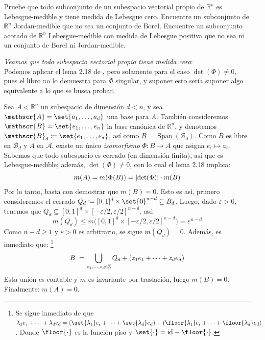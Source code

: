\setcounter{neje}{25}
\begin{nejer}
Pruebe que todo subconjunto de un subespacio vectorial propio de $\mathbb{R}^n$ es Lebesgue-medible y tiene medida de Lebesgue cero. Encuentre un subconjunto de $\mathbb{R}^n$ Jordan-medible que no sea un conjunto de Borel. Encuentre un subconjunto acotado de $\mathbb{R}^n$ Lebesgue-medible con medida de Lebesgue positiva que no sea ni un conjunto de Borel ni Jordan-medible.
\end{nejer}
\begin{sol}
\emph{Veamos que todo subespacio vectorial propio tiene medida cero}:\\
Podemos aplicar el lema 2.18 de \cite{Salamon}, pero solamente para el caso $\det(\Phi) \neq 0 $, pues el libro no lo demuestra para $\Phi$ singular, y suponer esto sería suponer algo equivalente a lo que se busca probar.\par
Sea $A < \mathbb{R}^n$ un subespacio de dimensión $d<n$, y sea $\mathscr{A} = \set{a_1,\dots,a_d}$ una base para $A$. También consideremos $\mathscr{B} = \set{e_1,\dots,e_n}$ la base canónica de $\mathbb{R}^n$, y denotemos $\mathscr{B}_d \coloneq \set{e_1,\dots,e_d}$, así como $B = \operatorname{Span}(\mathscr{B}_d)$. Como $B$ es libre en $\mathscr{B}_d$ y $A$ en $\mathscr{A}$, existe un único \emph{isomorfismo} $\Phi \colon B \to A$ que asigna $e_i \mapsto a_i$. Sabemos que todo subespacio es cerrado (en dimensión finita), así que es Lebesgue-medible; además, $\det(\Phi) \neq 0$, con lo cual el lema 2.18 implica:
\[
m(A) = m(\Phi(B)) = \abs{\det(\Phi)}\cdot m(B)
\]
Por lo tanto, basta con demostrar que $m(B) = 0$. Esto es así, primero consideremos el cerrado $Q_d \coloneq [0,1]^d\times\set{0}^{n-d} \subseteq B_d$. Luego, dado $\varepsilon>0$, tenemos que $Q_d \subseteq [0,1]^d\times[-\varepsilon/2,\varepsilon/2]^{n-d}$, así:
\[
m(Q_d) \leq m\bigl([0,1]^d\times[-\varepsilon/2,\varepsilon/2]^{n-d}\bigr) = \varepsilon^{n-d}
\]
Como $n-d \ge 1$ y $\varepsilon>0$ es arbitrario, se sigue $m(Q_d) = 0$. Además, es inmediato que:%
\footnote{
    Se sigue inmediato de que $\lambda_1e_i+\cdots+\lambda_de_d = (\set{\lambda_1}e_i+\cdots+\set{\lambda_d}e_d) + (\floor{\lambda_1}e_i+\cdots+\floor{\lambda_d}e_d)$. Donde $\floor{\cdot}$ es la función piso y $\set{\cdot}= {\id} - \floor{\cdot}$.
}
\[
B \;= \bigcup_{z_1,\dots,z_d \en \mathbb{Z}} Q_d + (z_1e_1+\cdots+z_de_d)
\]
Esta unión es contable y $m$ es invariante por traslación, luego $m(B) = 0$. Finalmente: $m(A) = 0$.\vspace{1em}\\

\end{sol}
